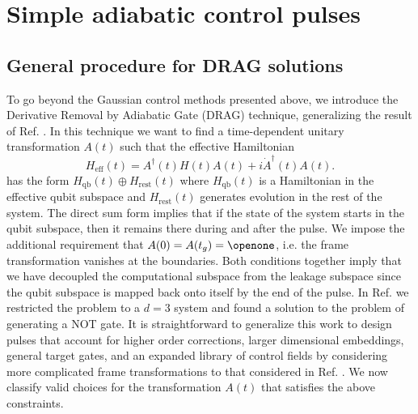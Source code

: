 \documentclass[pra,twocolumn,floatfix,superscriptaddress,eqsecnum]{revtex4-1}
\begin{document}
\section{Simple adiabatic control pulses}\label{sec:expansion}

\subsection{General procedure for DRAG solutions}

To go beyond the Gaussian control methods presented above, we introduce the Derivative Removal by Adiabatic Gate (DRAG) technique, generalizing the result of Ref. \cite{Motzoi2009}.
In this technique we want to find a time-dependent unitary transformation $A(t)$ such that the effective Hamiltonian
\begin{equation}\label{eq:Heff}
H_\mathrm{eff}(t) = A^\dagger (t) H(t) A(t) + i \dot{A}^{\dagger}(t) A(t).
\end{equation} has the form $H_\mathrm{qb}(t)\oplus H_\mathrm{rest}(t)$ where $H_\mathrm{qb}(t)$ is a Hamiltonian in the effective qubit subspace and $ H_\mathrm{rest}(t)$ generates evolution in the rest of the system. The direct sum form implies that if the state of the system starts in the qubit subspace, then it remains there during and after the pulse. We impose the  additional requirement that $A(0) = A(t_g) = \openone$, i.e. the frame transformation vanishes at the boundaries. Both conditions together imply that we have decoupled the computational subspace from the leakage subspace since the qubit subspace is mapped back onto itself by the end of the pulse.  In Ref. \cite{Motzoi2009} we restricted the problem to a $d=3$ system and found a solution to the problem of generating a NOT gate. It is straightforward to generalize this work to design pulses that account for higher order corrections, larger dimensional embeddings, general target gates, and an expanded library of control fields by considering more complicated frame transformations to that considered in Ref. \cite{Motzoi2009}. We now classify valid choices for the transformation $A(t)$ that satisfies the above constraints. 
\end{document}

